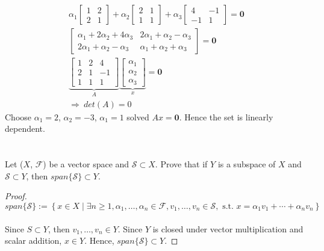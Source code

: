 \documentclass{article}
\theoremstyle{definition} %
\begin{document}
\section{}
\begin{align*}
    \alpha_1 
    \begin{bmatrix}
        1 & 2 \\ 2 & 1
    \end{bmatrix}
    +
    \alpha_2
    \begin{bmatrix}
        2 & 1 \\ 1 & 1
    \end{bmatrix}
    +
    \alpha_3
    \begin{bmatrix}
        4 & -1 \\ -1 & 1
    \end{bmatrix}
    = \mathbf 0\\
    \begin{bmatrix}
        \alpha_1 + 2\alpha_2 + 4\alpha_3 & 2\alpha_1 + \alpha_2 - \alpha_3\\
        2\alpha_1 + \alpha_2 - \alpha_3 & \alpha_1 + \alpha_2 + \alpha_3
    \end{bmatrix}
    = \mathbf0\\
    \underbrace{
    \begin{bmatrix}
        1 & 2 & 4\\
        2 & 1 & -1\\
        1 & 1 & 1
    \end{bmatrix}}_A
    \underbrace{
    \begin{bmatrix}
        \alpha_1 \\ \alpha_2 \\ \alpha_3
    \end{bmatrix}}_x
    = \mathbf 0\\
    \Rightarrow \ det(A) = 0
\end{align*}
Choose $\alpha_1 = 2$, $\alpha_2 = -3$, $\alpha_1 = 1$ solved $Ax = \mathbf 0$. Hence the set is linearly dependent.

\section{}
Let ($X$, $\mathcal F$) be a vector space and $\mathcal S \subset {X}$. Prove that if $Y$ is a subspace of $X$ and $\mathcal S \subset Y$, then $span\{\mathcal{S}\}\subset Y$.

\begin{proof}
    $$span\{\mathcal{S}\}:=\left\{x \in X \mid \exists n \geq 1, \alpha_1, \ldots, \alpha_n \in \mathcal{F}, v_1, \ldots, v_n \in \mathcal{S}, \text { s.t. } x=\alpha_1 v_1+\cdots+\alpha_n v_n\right\}$$\\
    Since $S\subset Y$, then $v_1, \ldots, v_n \in Y$. Since $Y$ is closed under vector multiplication and scalar addition, $x\in Y$. Hence, $span\{\mathcal{S}\}\subset Y$.
\end{proof}
\end{document}
